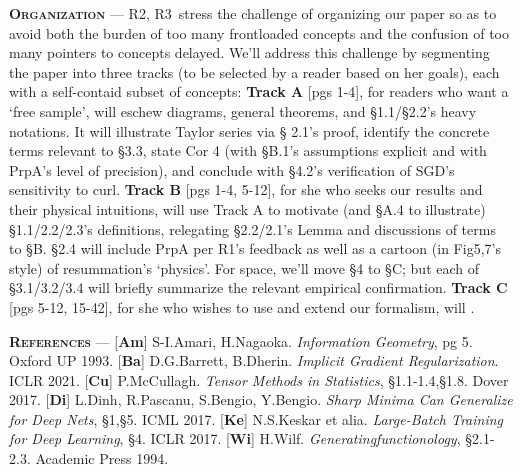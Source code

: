 \documentclass{article}
\newcommand{\Ra}{\textmd{\textsf{\color{purple!50} {R1}}}}
\newcommand{\Rb}{\textmd{\textsf{\color{green!60}  {R2}}}}
\newcommand{\Rc}{\textmd{\textsf{\color{blue!50}   {R3}}}}
\newcommand{\cor}[1]{\textmd{\textsf{Cor #1}}}
\newcommand{\fig}[1]{\textmd{{\color{gray}Fig}#1}}
\newcommand{\prp}[1]{\textmd{{\color{gray}Prp}{#1}}}
\newcommand{\cit}[1]{[\textbf{#1}]}
\newcommand{\moosect}[1]{\par\textsc{\textbf{#1}} ---}
\begin{document}
\moosect{Organization}
    \Rb,\Rc\ stress the challenge of 
    organizing our paper so as to avoid both the burden of too many
    frontloaded concepts and the confusion of too many pointers to
    concepts delayed.  We'll address this challenge by segmenting the paper
    into three tracks (to be selected by a reader based on her goals), each
    with a self-contaid subset of concepts: 
    \textbf{Track A} [pgs 1-4], for readers who want a `free sample', will
    eschew diagrams, general theorems, and \S1.1/\S2.2's heavy notations.  It will illustrate Taylor series via \S
    2.1's proof, identify the concrete terms relevant to \S 3.3, state \cor{4}
    (with \S B.1's assumptions explicit and with \prp{A}'s level of precision),
    and conclude with \S 4.2's verification of SGD's sensitivity to curl.  
    \textbf{Track B} [pgs 1-4, 5-12], for she who seeks our results and their
    physical intuitions, will use Track A to motivate (and \S A.4 to
    illustrate) \S1.1/2.2/2.3's definitions, relegating \S2.2/2.1's Lemma and
    discussions of terms to \S B.  \S 2.4 will include \prp{A} per \Ra's
    feedback as well as a cartoon (in \fig{5,7}'s style) of resummation's
    `physics'.  For space, we'll move \S 4 to \S C; but each of \S 3.1/3.2/3.4
    will briefly summarize the relevant empirical confirmation.
    \textbf{Track C} [pgs 5-12, 15-42], for she who wishes to use and extend
    our formalism, will {\color{moor}{FILL IN}}.

\moosect{References}
    \small%
    \cit{Am} S-I.Amari, H.Nagaoka. \emph{Information Geometry}, pg 5.  Oxford UP 1993.  
    \cit{Ba} D.G.Barrett, B.Dherin.  \emph{Implicit Gradient Regularization}.  ICLR 2021.
    \cit{Cu} P.McCullagh.  \emph{Tensor Methods in Statistics}, \S{1.1-1.4},\S{1.8}.  Dover 2017.
    \cit{Di} L.Dinh, R.Pascanu, S.Bengio, Y.Bengio.  \emph{Sharp Minima Can Generalize for Deep Nets}, \S{1},\S{5}.  ICML 2017.
    \cit{Ke} N.S.Keskar et alia.  \emph{Large-Batch Training for Deep Learning}, \S{4}.  ICLR 2017.
    \cit{Wi} H.Wilf.  \emph{Generatingfunctionology}, \S{2.1-2.3}.  Academic Press 1994.

\end{document}
